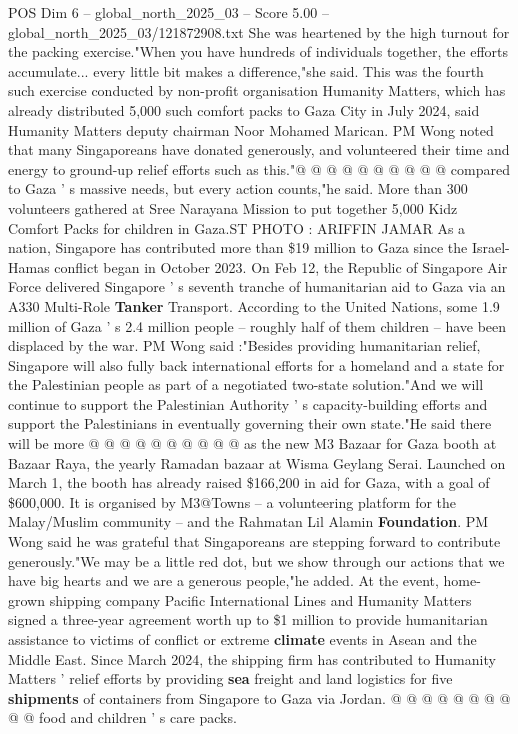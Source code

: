 \begin{textsample}{POS Dim 6 – global\_north\_2025\_03 – Score 5.00 – global\_north\_2025\_03/121872908.txt}
She was heartened by the high turnout for the packing exercise."When you have hundreds of individuals together, the efforts accumulate... every little bit makes a difference,"she said.
This was the fourth such exercise conducted by non-profit organisation Humanity Matters, which has already distributed 5,000 such comfort packs to Gaza City in July 2024, said Humanity Matters deputy chairman Noor Mohamed Marican.
PM Wong noted that many Singaporeans have donated generously, and volunteered their time and energy to ground-up relief efforts such as this."@ @ @ @ @ @ @ @ @ @ compared to Gaza ' s massive needs, but every action counts,"he said.
More than 300 volunteers gathered at Sree Narayana Mission to put together 5,000 Kidz Comfort Packs for children in Gaza.ST PHOTO : ARIFFIN JAMAR As a nation, Singapore has contributed more than \$19 million to Gaza since the Israel-Hamas conflict began in October 2023.
On Feb 12, the Republic of Singapore Air Force delivered Singapore ' s seventh tranche of humanitarian aid to Gaza via an A330 Multi-Role \textbf{Tanker} Transport.
According to the United Nations, some 1.9 million of Gaza ' s 2.4 million people -- roughly half of them children -- have been displaced by the war.
PM Wong said :"Besides providing humanitarian relief, Singapore will also fully back international efforts for a homeland and a state for the Palestinian people as part of a negotiated two-state solution."And we will continue to support the Palestinian Authority ' s capacity-building efforts and support the Palestinians in eventually governing their own state."He said there will be more @ @ @ @ @ @ @ @ @ @ as the new M3 Bazaar for Gaza booth at Bazaar Raya, the yearly Ramadan bazaar at Wisma Geylang Serai.
Launched on March 1, the booth has already raised \$166,200 in aid for Gaza, with a goal of \$600,000.
It is organised by M3@Towns -- a volunteering platform for the Malay/Muslim community -- and the Rahmatan Lil Alamin \textbf{Foundation}.
PM Wong said he was grateful that Singaporeans are stepping forward to contribute generously."We may be a little red dot, but we show through our actions that we have big hearts and we are a generous people,"he added.
At the event, home-grown shipping company Pacific International Lines and Humanity Matters signed a three-year agreement worth up to \$1 million to provide humanitarian assistance to victims of conflict or extreme \textbf{climate} events in Asean and the Middle East.
Since March 2024, the shipping firm has contributed to Humanity Matters ' relief efforts by providing \textbf{sea} freight and land logistics for five \textbf{shipments} of containers from Singapore to Gaza via Jordan. @ @ @ @ @ @ @ @ @ @ food and children ' s care packs.

\end{textsample}
